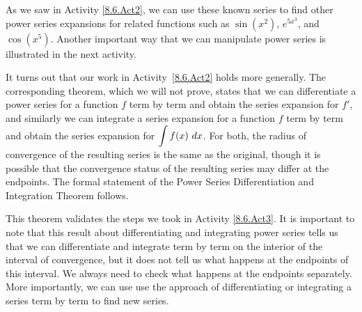 As we saw in Activity \ref{8.6.Act2}, we can use these known series to find other power series expansions for related functions such as $\sin(x^2)$, $e^{5x^3}$, and $\cos(x^5)$. Another important way that we can manipulate power series is illustrated in the next activity.



It turns out that our work in Activity~\ref{8.6.Act2} holds more generally.  The corresponding theorem, which we will not prove, states that we can differentiate a power series for a function $f$ term by term and obtain the series expansion for $f'$, and similarly we can integrate a series expansion for a function $f$ term by term and obtain the series expansion for $\displaystyle \int f(x) \ dx$.  For both, the radius of convergence of the resulting series is the same as the original, though it is possible that the convergence status of the resulting series may differ at the endpoints.  The formal statement of the Power Series Differentiation and Integration Theorem follows.

\vspace*{5pt}
\nin {}
\vspace*{1pt}

This theorem validates the steps we took in Activity \ref{8.6.Act3}. It is important to note that this result about differentiating and integrating power series tells us that we can differentiate and integrate term by term on the interior of the interval of convergence, but it does not tell us what happens at the endpoints of this interval. We always need to check what happens at the endpoints separately.   More importantly, we can use use the approach of differentiating or integrating a series term by term to find new series.

